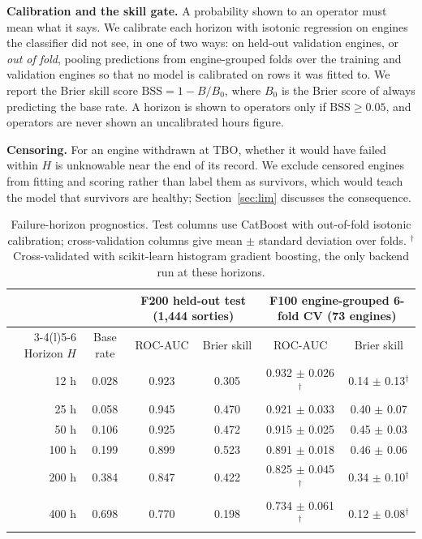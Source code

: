 \noindent\textbf{Calibration and the skill gate.} A probability shown to an operator must mean what it says. We calibrate each horizon with isotonic regression on engines the classifier did not see, in one of two ways: on held-out validation engines, or \emph{out of fold}, pooling predictions from engine-grouped folds over the training and validation engines so that no model is calibrated on rows it was fitted to. We report the Brier skill score $\mathrm{BSS} = 1 - B/B_0$, where $B_0$ is the Brier score of always predicting the base rate. A horizon is shown to operators only if $\mathrm{BSS} \ge 0.05$, and operators are never shown an uncalibrated hours figure.

\noindent\textbf{Censoring.} For an engine withdrawn at TBO, whether it would have failed within $H$ is unknowable near the end of its record. We exclude censored engines from fitting and scoring rather than label them as survivors, which would teach the model that survivors are healthy; Section~\ref{sec:lim} discusses the consequence.

\begin{table}[t]
\centering
\small
\begin{tabular}{@{}rccccc@{}}
\toprule
 & & \multicolumn{2}{c}{F200 held-out test (1,444 sorties)} & \multicolumn{2}{c}{F100 engine-grouped 6-fold CV (73 engines)} \\
\cmidrule(lr){3-4}\cmidrule(l){5-6}
Horizon $H$ & Base rate & ROC-AUC & Brier skill & ROC-AUC & Brier skill \\
\midrule
12 h & 0.028 & 0.923 & 0.305 & 0.932 $\pm$ 0.026$^\dagger$ & 0.14 $\pm$ 0.13$^\dagger$ \\
25 h & 0.058 & 0.945 & 0.470 & 0.921 $\pm$ 0.033 & 0.40 $\pm$ 0.07 \\
50 h & 0.106 & 0.925 & 0.472 & 0.915 $\pm$ 0.025 & 0.45 $\pm$ 0.03 \\
100 h & 0.199 & 0.899 & 0.523 & 0.891 $\pm$ 0.018 & 0.46 $\pm$ 0.06 \\
200 h & 0.384 & 0.847 & 0.422 & 0.825 $\pm$ 0.045$^\dagger$ & 0.34 $\pm$ 0.10$^\dagger$ \\
400 h & 0.698 & 0.770 & 0.198 & 0.734 $\pm$ 0.061$^\dagger$ & 0.12 $\pm$ 0.08$^\dagger$ \\
\bottomrule
\end{tabular}
\caption{Failure-horizon prognostics. Test columns use CatBoost with out-of-fold isotonic calibration; cross-validation columns give mean $\pm$ standard deviation over folds. $^\dagger$Cross-validated with scikit-learn histogram gradient boosting, the only backend run at these horizons.}
\label{tab:surv}
\end{table}


